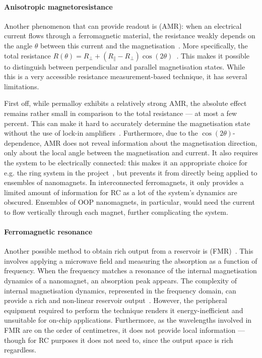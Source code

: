 \paragraph{Anisotropic magnetoresistance}
Another phenomenon that can provide readout is  (AMR): when an electrical current flows through a ferromagnetic material, the resistance weakly depends on the angle $\theta$ between this current and the magnetisation~\cite{AMR}.
More specifically, the total resistance $R(\theta) = R_\perp + (R_\parallel - R_\perp) \cos(2\theta)$~\cite{Hu2023}.
This makes it possible to distinguish between perpendicular and parallel magnetisation states.
While this is a very accessible resistance measurement-based technique, it has several limitations. \par
First off, while permalloy exhibits a relatively strong AMR, the absolute effect remains rather small in comparison to the total resistance --- at most a few percent.
This can make it hard to accurately determine the magnetisation state without the use of lock-in amplifiers~\cite{ArchitecturesNanoringRC,Vidamour2023}.
Furthermore, due to the $\cos(2 \theta)$-dependence, AMR does not reveal information about the magnetisation direction, only about the local angle between the magnetisation and current.
It also requires the system to be electrically connected: this makes it an appropriate choice for e.g. the ring system in the \spinengine project~\cite{Vidamour2023,ArchitecturesNanoringRC,DynamicEmergence_NanomagneticSystem}, but prevents it from directly being applied to ensembles of nanomagnets.
In interconnected ferromagnets, it only provides a limited amount of information for RC as a lot of the system's dynamics are obscured.
Ensembles of OOP nanomagnets, in particular, would need the current to flow vertically through each magnet, further complicating the system.

\paragraph{Ferromagnetic resonance}
Another possible method to obtain rich output from a reservoir is  (FMR)~\cite{AdaptiveProgrammableRC,gartside2022reconfigurable}.
This involves applying a microwave field and measuring the absorption as a function of frequency.
When the frequency matches a resonance of the internal magnetisation dynamics of a nanomagnet, an absorption peak appears.
The complexity of internal magnetisation dynamics, represented in the frequency domain, can provide a rich and non-linear reservoir output~\cite{AdaptiveProgrammableRC,Gomez-Iriarte_FMR}.
However, the peripheral equipment required to perform the technique renders it energy-inefficient and unsuitable for on-chip applications.
Furthermore, as the wavelengths involved in FMR are on the order of centimetres, it does not provide local information --- though for RC purposes it does not need to, since the output space is rich regardless.

